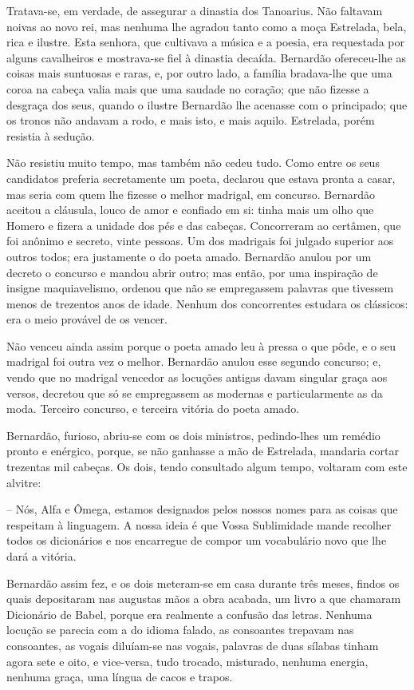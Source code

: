 Tratava-se, em verdade, de assegurar a dinastia dos Tanoarius. Não
faltavam noivas ao novo rei, mas nenhuma lhe agradou tanto como a moça
Estrelada, bela, rica e ilustre. Esta senhora, que cultivava a música e
a poesia, era requestada por alguns cavalheiros e mostrava-se fiel à
dinastia decaída. Bernardão ofereceu-lhe as coisas mais suntuosas e
raras, e, por outro lado, a família bradava-lhe que uma coroa na cabeça
valia mais que uma saudade no coração; que não fizesse a desgraça dos
seus, quando o ilustre Bernardão lhe acenasse com o principado; que os
tronos não andavam a rodo, e mais isto, e mais aquilo. Estrelada, porém
resistia à sedução.

Não resistiu muito tempo, mas também não cedeu tudo. Como entre os seus
candidatos preferia secretamente um poeta, declarou que estava pronta a
casar, mas seria com quem lhe fizesse o melhor madrigal, em concurso.
Bernardão aceitou a cláusula, louco de amor e confiado em si: tinha mais
um olho que Homero e fizera a unidade dos pés e das cabeças. Concorreram
ao certâmen, que foi anônimo e secreto, vinte pessoas. Um dos madrigais
foi julgado superior aos outros todos; era justamente o do poeta amado.
Bernardão anulou por um decreto o concurso e mandou abrir outro; mas
então, por uma inspiração de insigne maquiavelismo, ordenou que não se
empregassem palavras que tivessem menos de trezentos anos de idade.
Nenhum dos concorrentes estudara os clássicos: era o meio provável de os
vencer.

Não venceu ainda assim porque o poeta amado leu à pressa o que pôde, e o
seu madrigal foi outra vez o melhor. Bernardão anulou esse segundo
concurso; e, vendo que no madrigal vencedor as locuções antigas davam
singular graça aos versos, decretou que só se empregassem as modernas e
particularmente as da moda. Terceiro concurso, e terceira vitória do
poeta amado.

Bernardão, furioso, abriu-se com os dois ministros, pedindo-lhes um
remédio pronto e enérgico, porque, se não ganhasse a mão de Estrelada,
mandaria cortar trezentas mil cabeças. Os dois, tendo consultado algum
tempo, voltaram com este alvitre:

-- Nós, Alfa e Ômega, estamos designados pelos nossos nomes para as
coisas que respeitam à linguagem. A nossa ideia é que Vossa Sublimidade
mande recolher todos os dicionários e nos encarregue de compor um
vocabulário novo que lhe dará a vitória.

Bernardão assim fez, e os dois meteram-se em casa durante três meses,
findos os quais depositaram nas augustas mãos a obra acabada, um livro a
que chamaram Dicionário de Babel, porque era realmente a confusão das
letras. Nenhuma locução se parecia com a do idioma falado, as consoantes
trepavam nas consoantes, as vogais diluíam-se nas vogais, palavras de
duas sílabas tinham agora sete e oito, e vice-versa, tudo trocado,
misturado, nenhuma energia, nenhuma graça, uma língua de cacos e trapos.

